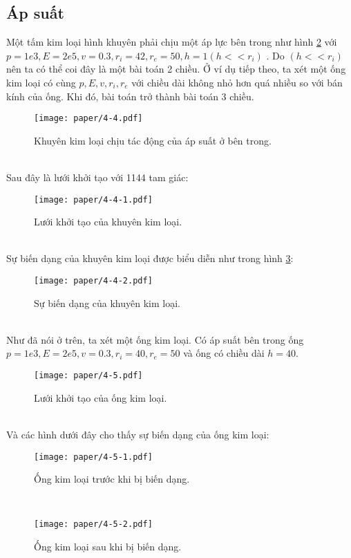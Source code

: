 \subsection{Áp suất}
Một tấm kim loại hình khuyên phải chịu một áp lực bên trong như hình \ref{fig:exam41} với $p=1e3,E=2e5, v=0.3, r_i=42, r_e=50, h=1 (h<<r_i)$ \cite{TIT-07}. Do $(h<<r_i)$ nên ta có thể coi đây là một bài toán 2 chiều. Ở ví dụ tiếp theo, ta xét một ống kim loại có cùng $p, E, v, r_i, r_e$ với chiều dài không nhỏ hơn quá nhiều so với bán kính của ống. Khi đó, bài toán trở thành bài toán 3 chiều.\\
\begin{figure}[http]
\centering
\texttt{[image: paper/4-4.pdf]}
\caption{Khuyên kim loại chịu tác động của áp suất ở bên trong.}
\label{fig:exam40}
\end{figure}\\
Sau đây là lưới khởi tạo với 1144 tam giác:\\
\begin{figure}[http]
\centering
\texttt{[image: paper/4-4-1.pdf]}
\caption{Lưới khởi tạo của khuyên kim loại.}
\label{fig:exam41}
\end{figure}\\
Sự biến dạng của khuyên kim loại được biểu diễn như trong hình \ref{fig:exam42}:
\begin{figure}[http]
\centering
\texttt{[image: paper/4-4-2.pdf]}
\caption{Sự biến dạng của khuyên kim loại.}
\label{fig:exam42}
\end{figure}\\
Như đã nói ở trên, ta xét một ống kim loại. Có áp suất bên trong ống $p=1e3,E=2e5, v=0.3, r_i=40, r_e=50$ và ống có chiều dài $h=40$.\\
\begin{figure}[http]
\centering
\texttt{[image: paper/4-5.pdf]}
\caption{Lưới khởi tạo của ống kim loại.}
\label{fig:exam50}
\end{figure}\\
Và các hình dưới đây cho thấy sự biến dạng của ống kim loại:
\begin{figure}[http]
\centering
\texttt{[image: paper/4-5-1.pdf]}
\caption{Ống kim loại trước khi bị biến dạng.}
\label{fig:exam51}
\end{figure}\\
\begin{figure}[http]
\centering
\texttt{[image: paper/4-5-2.pdf]}
\caption{Ống kim loại sau khi bị biến dạng.}
\label{fig:exam52}
\end{figure}\\

